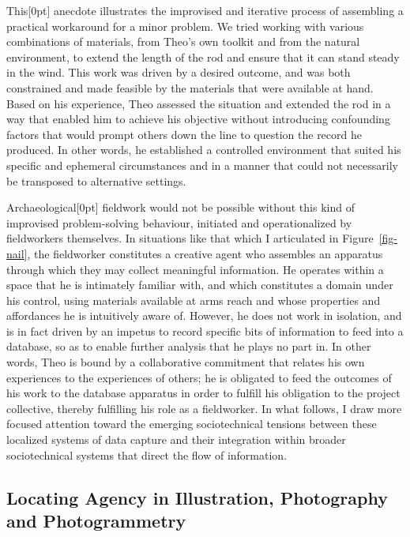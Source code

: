 \documentclass[
]{article}
\newcommand{\paragraphnumber}[1]{\marginnote{\color{lightgray}\tiny{#1}}[0pt]}
\begin{document}
This\paragraphnumber{[47]} anecdote illustrates the improvised and
iterative process of assembling a practical workaround for a minor
problem. We tried working with various combinations of materials, from
Theo's own toolkit and from the natural environment, to extend the
length of the rod and ensure that it can stand steady in the wind. This
work was driven by a desired outcome, and was both constrained and made
feasible by the materials that were available at hand. Based on his
experience, Theo assessed the situation and extended the rod in a way
that enabled him to achieve his objective without introducing
confounding factors that would prompt others down the line to question
the record he produced. In other words, he established a controlled
environment that suited his specific and ephemeral circumstances and in
a manner that could not necessarily be transposed to alternative
settings.

Archaeological\paragraphnumber{[48]} fieldwork would not be possible
without this kind of improvised problem-solving behaviour, initiated and
operationalized by fieldworkers themselves. In situations like that
which I articulated in Figure~\ref{fig-nail}, the fieldworker
constitutes a creative agent who assembles an apparatus through which
they may collect meaningful information. He operates within a space that
he is intimately familiar with, and which constitutes a domain under his
control, using materials available at arms reach and whose properties
and affordances he is intuitively aware of. However, he does not work in
isolation, and is in fact driven by an impetus to record specific bits
of information to feed into a database, so as to enable further analysis
that he plays no part in. In other words, Theo is bound by a
collaborative commitment that relates his own experiences to the
experiences of others; he is obligated to feed the outcomes of his work
to the database apparatus in order to fulfill his obligation to the
project collective, thereby fulfilling his role as a fieldworker. In
what follows, I draw more focused attention toward the emerging
sociotechnical tensions between these localized systems of data capture
and their integration within broader sociotechnical systems that direct
the flow of information.

\subsection{Locating Agency in Illustration, Photography and
Photogrammetry}\label{locating-agency-in-illustration-photography-and-photogrammetry}
\end{document}

